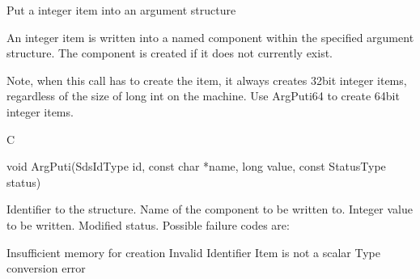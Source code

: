 \begin{manroutinedescription}
      Put a integer item into an argument structure

      An integer item is written into a named component within the
      specified argument structure. The component is created if it
      does not currently exist.
 
      Note, when this call has to create the item, it always creates
      32bit integer {} items, regardless of the size of long int on
      the machine.  Use ArgPuti64 to create 64bit integer items.
 
      C

      void ArgPuti(SdsIdType id, const char *name, long value, const %
StatusType {\mantt{*}} status)
 
\begin{manparametertable}
 Identifier to the structure.
 Name of the component to be %
written to.
 Integer value to be written.
 Modified status. Possible %
failure codes are:
\end{manparametertable}
\begin{mantwocolumntable}
Insufficient memory for creation
Invalid Identifier
Item is not a scalar
Type conversion error
\end{mantwocolumntable}
\end{manroutinedescription}

